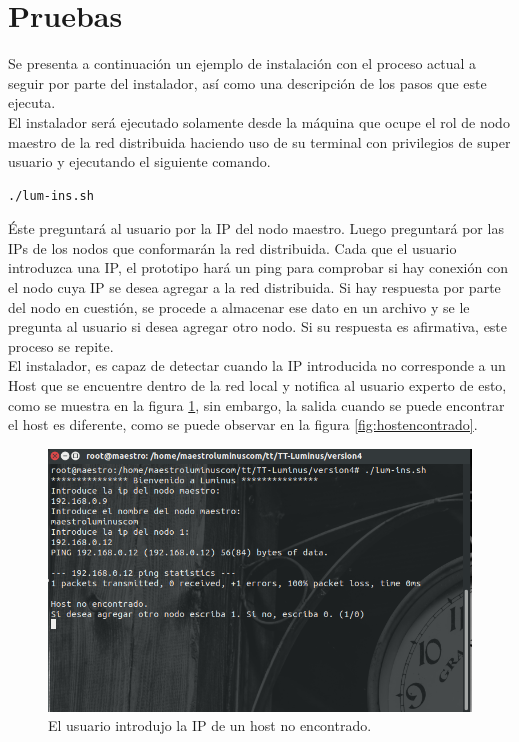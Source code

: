\section{Pruebas}
Se presenta a continuación un ejemplo de instalación con el proceso actual a seguir por parte del instalador, así como una descripción de los pasos que este ejecuta. 
\\
El instalador será ejecutado solamente desde la máquina que ocupe el rol de nodo maestro de la red distribuida haciendo uso de su terminal con privilegios de super usuario y ejecutando el siguiente comando. 
\\
\begin{verbatim}
./lum-ins.sh
\end{verbatim}
Éste preguntará al usuario por la IP del nodo maestro. Luego preguntará por las IPs de los nodos que conformarán la red distribuida. Cada que el usuario introduzca una IP, el prototipo hará un ping para comprobar si hay conexión con el nodo cuya IP se desea agregar a la red distribuida. Si hay respuesta por parte del nodo en cuestión, se procede a almacenar ese dato en un archivo y se le pregunta al usuario si desea agregar otro nodo. Si su respuesta es afirmativa, este proceso se repite. 
\\
El instalador, es capaz de detectar cuando la IP introducida no corresponde a un Host que se encuentre dentro de la red local y notifica al usuario experto de esto, como se muestra en la figura \ref{fig:hostnoencontrado}, sin embargo, la salida cuando se puede encontrar el host es diferente, como se puede observar en la figura \ref{fig:hostencontrado}.
\\

\begin{figure}[H]
	\hypertarget{fig:hostnoencontrado}{\hspace{1pt}}
	\begin{center}	
		\includegraphics[width=.7\textwidth]{capitulo5/images/hostnoencontrado.png}
		\caption{El usuario introdujo la IP de un host no encontrado.}
	\end{center}
	\label{fig:hostnoencontrado}
\end{figure}


